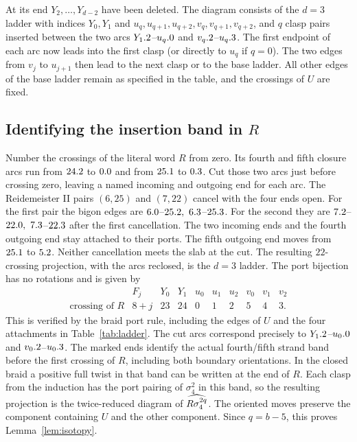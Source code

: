 At its end \(Y_2,\ldots,Y_{d-2}\) have been deleted.
The diagram consists of the \(d=3\) ladder with indices
\(Y_0,Y_1\) and \(u_q,u_{q+1},u_{q+2},v_q,v_{q+1},v_{q+2}\),
and \(q\) clasp pairs inserted between the two arcs
\(Y_1.2\)--\(u_q.0\) and
\(v_q.2\)--\(u_q.3\).
The first endpoint of each arc now leads into the first clasp
(or directly to \(u_q\) if \(q=0\)). The two edges
from \(v_j\) to \(u_{j+1}\) then lead to the next clasp or
to the base ladder. All other edges of the base ladder remain
as specified in the table, and the crossings of \(U\) are fixed.

\subsection{Identifying the insertion band in \texorpdfstring{\(R\)}{R}}

Number the crossings of the literal word \(R\) from zero.
Its fourth and fifth closure arcs run from \(24.2\)
to \(0.0\) and from \(25.1\) to \(0.3\).
Cut those two arcs just before crossing zero, leaving a named
incoming and outgoing end for each arc. The Reidemeister II
pairs \((6,25)\) and \((7,22)\) cancel with the four ends
open. For the first pair the bigon edges are
\(6.0\)--\(25.2,\ 6.3\)--\(25.3\).
For the second they are
\(7.2\)--\(22.0,\ 7.3\)--\(22.3\)
after the first cancellation. The two incoming ends and
the fourth outgoing end stay attached to their ports.
The fifth outgoing end moves from \(25.1\) to
\(5.2\). Neither cancellation meets the slab at the cut.
The resulting \(22\)-crossing projection, with the arcs
reclosed, is the \(d=3\) ladder. The port bijection has no
rotations and is given by
\[
 \begin{array}{c|ccccccccc}
 &F_j&Y_0&Y_1&u_0&u_1&u_2&v_0&v_1&v_2\\\hline
 \text{crossing of }R&8+j&23&24&0&1&2&5&4&3 .
 \end{array}
\]
This is verified by the braid port rule, including the edges
of \(U\) and the four attachments in Table~\ref{tab:ladder}.
The cut arcs correspond precisely to
\(Y_1.2\)--\(u_0.0\) and
\(v_0.2\)--\(u_0.3\).
The marked ends identify the actual fourth/fifth strand band
before the first crossing of \(R\), including both boundary
orientations. In the closed braid a positive full twist in
that band can be written at the end of \(R\).
Each clasp from the induction has the port pairing of
\(\sigma_4^2\) in this band, so the resulting projection is
the twice-reduced diagram of \(\widehat{R\sigma_4^{2q}}\).
The oriented moves preserve the component containing \(U\)
and the other component. Since \(q=b-5\), this proves
Lemma~\ref{lem:isotopy}.
